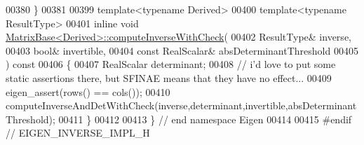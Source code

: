 \begin{DoxyCode}
00380 \}
00381 
00399 \textcolor{keyword}{template}<\textcolor{keyword}{typename} Derived>
00400 \textcolor{keyword}{template}<\textcolor{keyword}{typename} ResultType>
00401 \textcolor{keyword}{inline} \textcolor{keywordtype}{void} \hyperlink{group___core___module_a116f3b50d2af7dbdf7473e517a5b8b0f}{MatrixBase<Derived>::computeInverseWithCheck}(
00402     ResultType& inverse,
00403     \textcolor{keywordtype}{bool}& invertible,
00404     \textcolor{keyword}{const} RealScalar& absDeterminantThreshold
00405   )\textcolor{keyword}{ const}
00406 \textcolor{keyword}{}\{
00407   RealScalar determinant;
00408   \textcolor{comment}{// i'd love to put some static assertions there, but SFINAE means that they have no effect...}
00409   eigen\_assert(rows() == cols());
00410   computeInverseAndDetWithCheck(inverse,determinant,invertible,absDeterminantThreshold);
00411 \}
00412 
00413 \} \textcolor{comment}{// end namespace Eigen}
00414 
00415 \textcolor{preprocessor}{#endif // EIGEN\_INVERSE\_IMPL\_H}
\end{DoxyCode}
